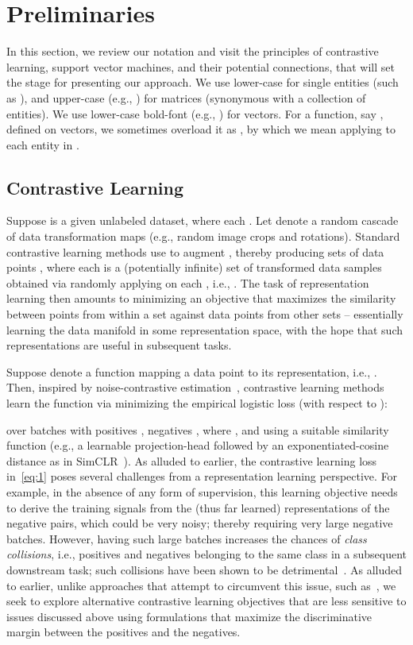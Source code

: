 \documentclass[letterpaper]{article} \usepackage{aaai22}  \usepackage{times}  \usepackage{helvet}  \usepackage{courier}  \usepackage[hyphens]{url}  \usepackage{graphicx} \urlstyle{rm} \def\UrlFont{\rm}  \usepackage{natbib}  \usepackage{caption} \DeclareCaptionStyle{ruled}{labelfont=normalfont,labelsep=colon,strut=off} \frenchspacing  \setlength{\pdfpagewidth}{8.5in}  \setlength{\pdfpageheight}{11in}
\begin{document}
\section{Preliminaries}
In this section, we review our notation and visit the principles of contrastive learning, support vector machines, and their potential connections, that will set the stage for presenting our approach. We use lower-case for single entities (such as ), and upper-case (e.g., ) for matrices (synonymous with a collection of entities). We use lower-case bold-font (e.g., ) for vectors. For a function, say , defined on vectors, we sometimes overload it as , by which we mean applying  to each entity in . 

\subsection{Contrastive Learning}
Suppose  is a given unlabeled dataset, where each . Let  denote a random cascade of data transformation maps (e.g., random image crops and rotations). 
Standard contrastive learning methods use  to augment , thereby producing sets of data points , where each  is a (potentially infinite) set of transformed data samples obtained via randomly applying  on each , i.e., . The task of representation learning then amounts to minimizing an objective that maximizes the similarity between points from within a set against data points from other sets -- essentially learning the data manifold in some representation space, with the hope that such representations are useful in subsequent tasks. 

Suppose  denote a function mapping a data point  to its representation, i.e., . Then, inspired by noise-contrastive estimation~\cite{gutmann2010noise}, contrastive learning methods learn the function  via minimizing the empirical logistic loss (with respect to ):

over batches  with positives , negatives , where , and using a suitable similarity function  (e.g., a learnable projection-head followed by an exponentiated-cosine distance as in SimCLR~\cite{chen2020simple}). 
As alluded to earlier, the contrastive learning loss in~\eqref{eq:1} poses several challenges from a representation learning perspective. For example, in the absence of any form of supervision, this learning objective needs to derive the training signals from the (thus far learned) representations of the negative pairs, which could be very noisy; thereby requiring very large negative batches. However, having such large batches increases the chances of \emph{class collisions}, i.e., positives and negatives belonging to the same class in a subsequent downstream task; such collisions have been shown to be detrimental~\cite{arora2019theoretical}. As alluded to earlier, unlike approaches that attempt to circumvent this issue, such as~\cite{huynh2020boosting,robinson2021contrastive,chuang2020debiased}, we seek to explore alternative contrastive learning objectives that are less sensitive to issues discussed above using formulations that maximize the discriminative margin between the positives and the negatives. 
\end{document}
